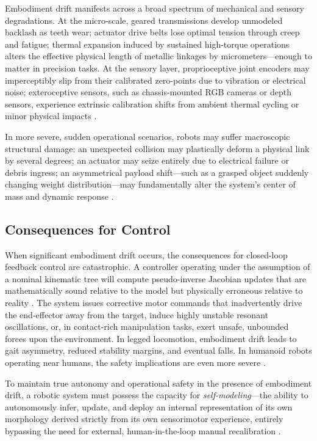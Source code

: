 \documentclass[12pt,a4paper,oneside]{report}
\begin{document}
Embodiment drift manifests across a broad spectrum of mechanical and sensory degradations. At the micro-scale, geared transmissions develop unmodeled backlash as teeth wear; actuator drive belts lose optimal tension through creep and fatigue; thermal expansion induced by sustained high-torque operations alters the effective physical length of metallic linkages by micrometers---enough to matter in precision tasks. At the sensory layer, proprioceptive joint encoders may imperceptibly slip from their calibrated zero-points due to vibration or electrical noise; exteroceptive sensors, such as chassis-mounted RGB cameras or depth sensors, experience extrinsic calibration shifts from ambient thermal cycling or minor physical impacts \cite{rezvani2024robust}.

In more severe, sudden operational scenarios, robots may suffer macroscopic structural damage: an unexpected collision may plastically deform a physical link by several degrees; an actuator may seize entirely due to electrical failure or debris ingress; an asymmetrical payload shift---such as a grasped object suddenly changing weight distribution---may fundamentally alter the system's center of mass and dynamic response \cite{kwiatkowski2019task}.

\subsection{Consequences for Control}
\label{subsec:consequences_control}

When significant embodiment drift occurs, the consequences for closed-loop feedback control are catastrophic. A controller operating under the assumption of a nominal kinematic tree will compute pseudo-inverse Jacobian updates that are mathematically sound relative to the model but physically erroneous relative to reality \cite{siciliano2009robotics}. The system issues corrective motor commands that inadvertently drive the end-effector away from the target, induce highly unstable resonant oscillations, or, in contact-rich manipulation tasks, exert unsafe, unbounded forces upon the environment. In legged locomotion, embodiment drift leads to gait asymmetry, reduced stability margins, and eventual falls. In humanoid robots operating near humans, the safety implications are even more severe \cite{kwiatkowski2019task}.

To maintain true autonomy and operational safety in the presence of embodiment drift, a robotic system must possess the capacity for \textit{self-modeling}---the ability to autonomously infer, update, and deploy an internal representation of its own morphology derived strictly from its own sensorimotor experience, entirely bypassing the need for external, human-in-the-loop manual recalibration \cite{chen2022full, kwiatkowski2019task}.
\end{document}
